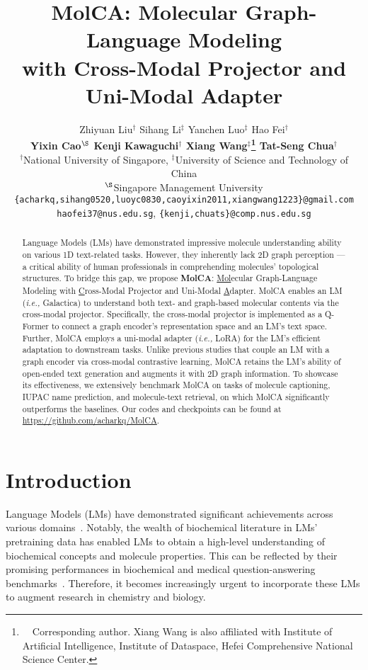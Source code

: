 \documentclass[11pt]{article}
\title{MolCA: Molecular Graph-Language Modeling\\ with Cross-Modal Projector and Uni-Modal Adapter}
\author{Zhiyuan Liu$^\dag$ \quad Sihang Li$^\ddag$ \quad Yanchen Luo$^\ddag$  \quad Hao Fei$^\dag$ \\ \textbf{Yixin Cao$^\S$ \quad Kenji Kawaguchi$^\dag$ \quad Xiang Wang$^\ddag$\thanks{~~Corresponding author. Xiang Wang is also affiliated with Institute of Artificial Intelligence, Institute of Dataspace, Hefei Comprehensive National Science Center.} \quad Tat-Seng Chua$^\dag$} \\
$^\dag$National University of Singapore, $^\ddag$University of Science and Technology of China\\
$^\S$Singapore Management University\\
\texttt{\{acharkq,sihang0520,luoyc0830,caoyixin2011,xiangwang1223\}@gmail.com} \\ \texttt{haofei37@nus.edu.sg}, \texttt{\{kenji,chuats\}@comp.nus.edu.sg}\\}
\newcommand{\ie}{\emph{i.e., }}
\begin{document}
\maketitle








\begin{abstract}
    Language Models (LMs) have demonstrated impressive molecule understanding ability on various 1D text-related tasks. However, they inherently lack 2D graph perception — a critical ability of human professionals in comprehending molecules' topological structures. To bridge this gap, we propose \textbf{MolCA}: \underline{Mol}ecular Graph-Language Modeling with \underline{C}ross-Modal Projector and Uni-Modal \underline{A}dapter. MolCA enables an LM (\ie Galactica) to understand both text- and graph-based molecular contents via the cross-modal projector. Specifically, the cross-modal projector is implemented as a Q-Former to connect a graph encoder's representation space and an LM's text space. Further, MolCA employs a uni-modal adapter (\ie LoRA) for the LM's efficient adaptation to downstream tasks. Unlike previous studies that couple an LM with a graph encoder via cross-modal contrastive learning, MolCA retains the LM's ability of open-ended text generation and augments it with 2D graph information. To showcase its effectiveness, we extensively benchmark MolCA on tasks of molecule captioning, IUPAC name prediction, and molecule-text retrieval, on which MolCA significantly outperforms the baselines. Our codes and checkpoints can be found at \url{https://github.com/acharkq/MolCA}.
\end{abstract} 
\section{Introduction}
Language Models (LMs) have demonstrated significant achievements across various domains~\citep{BERT, LLMSurvey}. Notably, the wealth of biochemical literature in LMs' pretraining data has enabled LMs to obtain a high-level understanding of biochemical concepts and molecule properties. This can be reflected by their promising performances in biochemical and medical question-answering benchmarks~\citep{Galactica,GPT4}. Therefore, it becomes increasingly urgent to incorporate these LMs to augment research in chemistry and biology.
\end{document}
